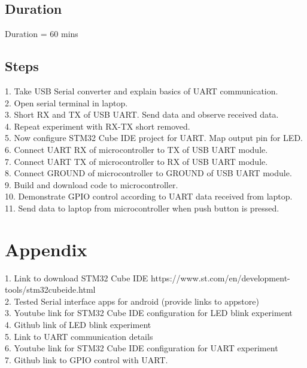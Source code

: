 \documentclass[11pt]{article}
\begin{document}
\subsection{Duration}
Duration = 60 mins
\subsection{Steps}
1. Take USB Serial converter and explain basics of UART communication.\\
2. Open serial terminal in laptop. \\
3. Short RX and TX of USB UART. Send data and observe received data.\\
4. Repeat experiment with RX-TX short removed.\\
5. Now configure STM32 Cube IDE project for UART. Map output pin for LED.\\
6. Connect UART RX of microcontroller to TX of USB UART module.\\
7. Connect UART TX of microcontroller to RX of USB UART module.\\
8. Connect GROUND of microcontroller to GROUND of USB UART module.\\
9. Build and download code to microcontroller.\\
10. Demonstrate GPIO control according to UART data received from laptop.\\
11. Send data to laptop from microcontroller when push button is pressed.
\section{Appendix}
1. Link to download STM32 Cube IDE https://www.st.com/en/development-tools/stm32cubeide.html  \\
2. Tested Serial interface apps for android
 (provide links to appstore)\\
3. Youtube link for STM32 Cube IDE configuration for LED blink experiment\\
4. Github link of LED blink experiment\\
5. Link to UART communication details\\
6. Youtube link for STM32 Cube IDE configuration for UART experiment\\
7. Github link to GPIO control with UART.
\end{document}
